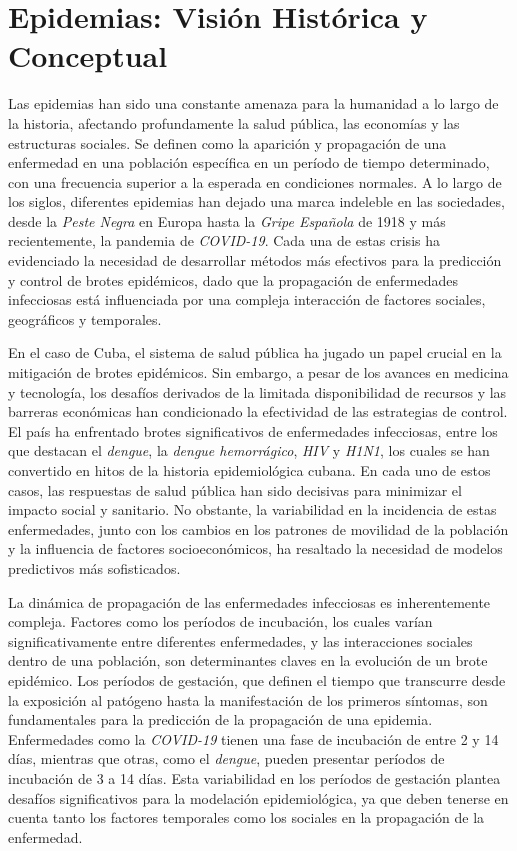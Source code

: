 \section{Epidemias: Visión Histórica y Conceptual}\label{section:epidemics-history-conceptual}

Las epidemias han sido una constante amenaza para la humanidad a lo largo de la historia, afectando profundamente la salud pública, las economías y las estructuras sociales. Se definen como la aparición y propagación de una enfermedad en una población específica en un período de tiempo determinado, con una frecuencia superior a la esperada en condiciones normales. A lo largo de los siglos, diferentes epidemias han dejado una marca indeleble en las sociedades, desde la \textit{Peste Negra} en Europa hasta la \textit{Gripe Española} de 1918 y más recientemente, la pandemia de \textit{COVID-19}. Cada una de estas crisis ha evidenciado la necesidad de desarrollar métodos más efectivos para la predicción y control de brotes epidémicos, dado que la propagación de enfermedades infecciosas está influenciada por una compleja interacción de factores sociales, geográficos y temporales.

En el caso de Cuba, el sistema de salud pública ha jugado un papel crucial en la mitigación de brotes epidémicos. Sin embargo, a pesar de los avances en medicina y tecnología, los desafíos derivados de la limitada disponibilidad de recursos y las barreras económicas han condicionado la efectividad de las estrategias de control. El país ha enfrentado brotes significativos de enfermedades infecciosas, entre los que destacan el \textit{dengue}, la \textit{dengue hemorrágico}, \textit{HIV} y \textit{H1N1}, los cuales se han convertido en hitos de la historia epidemiológica cubana. En cada uno de estos casos, las respuestas de salud pública han sido decisivas para minimizar el impacto social y sanitario. No obstante, la variabilidad en la incidencia de estas enfermedades, junto con los cambios en los patrones de movilidad de la población y la influencia de factores socioeconómicos, ha resaltado la necesidad de modelos predictivos más sofisticados.

La dinámica de propagación de las enfermedades infecciosas es inherentemente compleja. Factores como los períodos de incubación, los cuales varían significativamente entre diferentes enfermedades, y las interacciones sociales dentro de una población, son determinantes claves en la evolución de un brote epidémico. Los períodos de gestación, que definen el tiempo que transcurre desde la exposición al patógeno hasta la manifestación de los primeros síntomas, son fundamentales para la predicción de la propagación de una epidemia. Enfermedades como la \textit{COVID-19} tienen una fase de incubación de entre 2 y 14 días, mientras que otras, como el \textit{dengue}, pueden presentar períodos de incubación de 3 a 14 días. Esta variabilidad en los períodos de gestación plantea desafíos significativos para la modelación epidemiológica, ya que deben tenerse en cuenta tanto los factores temporales como los sociales en la propagación de la enfermedad.

